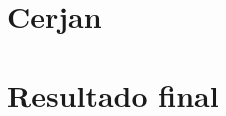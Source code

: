 \documentclass[10pt]{beamer} %
\begin{document}
\section{Cerjan}

\section{Resultado final}




%
%
%
%

\end{document}
